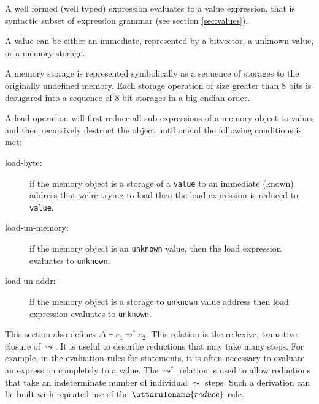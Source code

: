 \documentclass[11pt]{article}
\begin{document}
A well formed (well typed) expression evaluates to a value expression,
that is syntactic subset of expression grammar (see
section \ref{sec:values}).

A value can be either an immediate, represented by a bitvector, a
unknown value, or a memory storage.

A memory storage is represented symbolically as a sequence of
storages to the originally undefined memory. Each storage
operation of size greater than 8 bits is desugared into a sequence of
8 bit storages in a big endian order.

A load operation will first reduce all sub expressions of a memory
object to values and then recursively destruct the object until one of
the following conditions is met:


\begin{description}
\item[load-byte:] if the memory object is a storage of a \verb|value|
  to an immediate (known) address that we're trying to load then the
  load expression is reduced to \verb|value|.
\item[load-un-memory:] if the memory object is an \verb|unknown| value,
  then the load expression evaluates to \verb|unknown|.
\item[load-un-addr:] if the memory object is a storage to
  \verb|unknown| value address then load expression evaluates to
  \verb|unknown|.
\end{description}

This section also defines $\Delta \vdash e_1 \leadsto^{*} e_2$.  This relation
is the reflexive, transitive closure of $\leadsto$.  It is useful to describe
reductions that may take many steps.  For example, in the evaluation rules for
statements, it is often necessary to evaluate an expression completely to a
value.  The $\leadsto^{*}$ relation is used to allow reductions that take an
indeterminate number of individual $\leadsto$ steps.  Such a derivation can be
built with repeated use of the $\ottdrulename{reduce}$ rule.

\medskip

\ottdefnsreduceXXexp

\ottdefnshelpers

\ottdefnsmultistepXXexp
\end{document}
